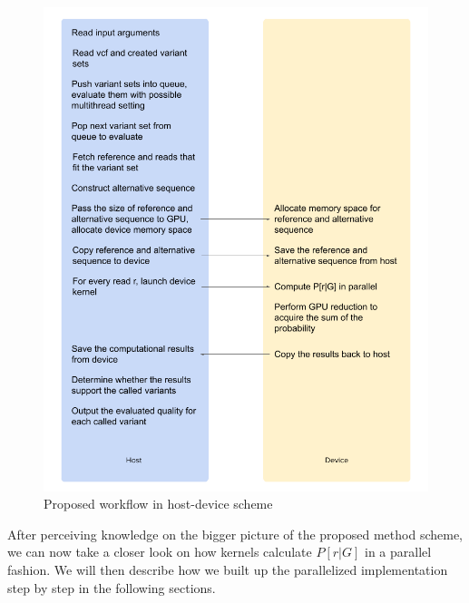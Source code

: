\documentclass{PHlab-thesis}
\begin{document}
\begin{figure}
	\centering
	\includegraphics[scale=0.8]{figures/proposed.png}
	\caption{Proposed workflow in host-device scheme}
	\label{fig:prop} %
\end{figure}

After perceiving knowledge on the bigger picture of the proposed method scheme, we can now take a closer look on how kernels calculate $P[r|G]$ in a parallel fashion. We will then describe how we built up the parallelized implementation step by step in the following sections.
\end{document}

